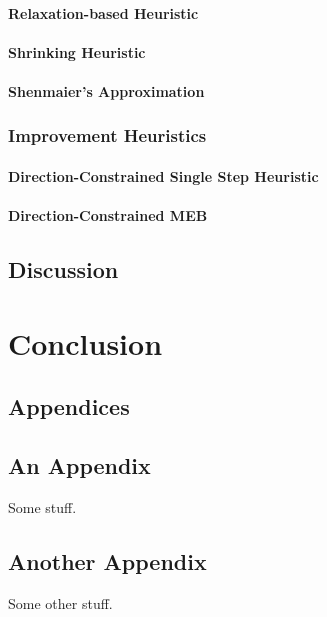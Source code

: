 \documentclass[11pt,twoside]{report}
\theoremstyle{definition}
\numberwithin{theorem}{section}
\numberwithin{definition}{section}
\numberwithin{lemma}{section}
\numberwithin{proposition}{section}
\numberwithin{equation}{section}
\numberwithin{figure}{section}
\begin{document}
\subsubsection{Relaxation-based Heuristic}
\subsubsection{Shrinking Heuristic}
\subsubsection{Shenmaier's Approximation}

\subsection{Improvement Heuristics}
\subsubsection{Direction-Constrained Single Step Heuristic}
\subsubsection{Direction-Constrained MEB}

\section{Discussion}

\chapter{Conclusion}


\clearpage

\appendix
\section*{Appendices}

\section{An Appendix}
\label{app:one}

Some stuff.
\clearpage

\section{Another Appendix}
\label{app:two}

Some other stuff.
\end{document}
